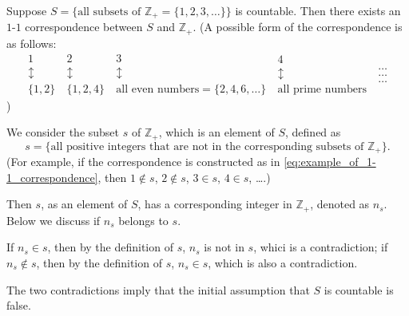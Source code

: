 \documentclass[a4paper,12pt]{article}
\newcommand{\intZ}{\mathbb{Z}}
\theoremstyle{definition}
\theoremstyle{remark}
\begin{document}
Suppose $S = \{ \text{all subsets of } \intZ_+ = \{ 1, 2, 3, \dotsc \} \}$ is countable. Then there exists an $1$-$1$ correspondence between $S$ and $\intZ_+$. (A possible form of the correspondence is as follows:
\begin{equation} \label{eq:example_of_1-1_correspondence}
  \begin{gathered}
    1 \\
    \updownarrow \\
    \{ 1, 2 \}
  \end{gathered}
  \
  \begin{gathered}
    2 \\
    \updownarrow \\
    \{ 1, 2, 4 \}
  \end{gathered}
  \
  \begin{gathered}
    3 \\
    \updownarrow \\
    \text{all even numbers} = \{ 2, 4, 6, \dotsc \} 
  \end{gathered}
  \
  \begin{gathered}
    4 \\
    \updownarrow \\
    \text{all prime numbers}
  \end{gathered}
  \
  \begin{gathered}
    \dots \\
    \dots \\
    \dots
  \end{gathered}
\end{equation}
)

We consider the subset $s$ of $\intZ_+$, which is an element of $S$, defined as
\begin{equation*}
  s = \{ \text{all positive integers that are not in the corresponding subsets of } \intZ_+ \}.
\end{equation*}
(For example, if the correspondence is constructed as in \eqref{eq:example_of_1-1_correspondence}, then $1 \not\in s$, $2 \not\in s$, $3 \in s$, $4 \in s$, \dots.)

Then $s$, as an element of $S$, has a corresponding integer in $\intZ_+$, denoted as $n_s$. Below we discuss if $n_s$ belongs to $s$.

If $n_s \in s$, then by the definition of $s$, $n_s$ is not in $s$, whici is a contradiction; if $n_s \not\in s$, then by the definition of $s$, $n_s \in s$, which is also a contradiction.

The two contradictions imply that the initial assumption that $S$ is countable is false.
\end{document}
